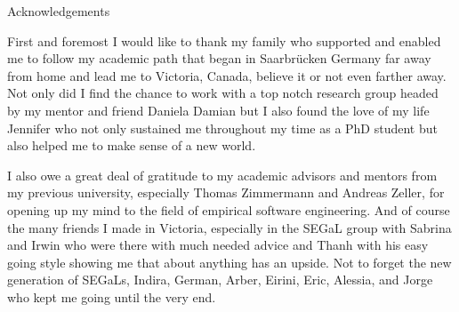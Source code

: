 \newpage
{}

\begin{center}
Acknowledgements
\end{center}

First and foremost I would like to thank my family who supported and enabled me to follow my academic path that began in Saarbr{\"u}cken Germany far away from home and lead me to Victoria, Canada, believe it or not even farther away.
%
Not only did I find the chance to work with a top notch research group headed by my mentor and friend Daniela Damian but I also found the love of my life Jennifer who not only sustained me throughout my time as a PhD student but also helped me to make sense of a new world.

I also owe a great deal of gratitude to my academic advisors and mentors from my previous university, especially Thomas Zimmermann and Andreas Zeller, for opening up my mind to the field of empirical software engineering.
%
And of course the many friends I made in Victoria, especially in the SEGaL group with Sabrina and Irwin who were there with much needed advice and Thanh with his easy going style showing me that about anything has an upside.
Not to forget the new generation of SEGaLs, Indira, German, Arber, Eirini, Eric, Alessia, and Jorge who kept me going until the very end.




